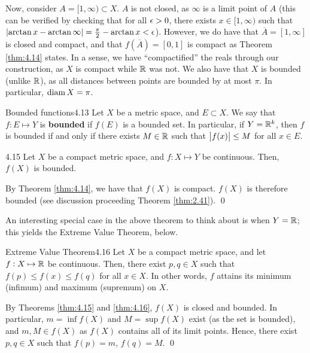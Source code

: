 Now, consider $A = [1, \infty) \subset X$. $A$ is not closed, as $\infty$ is a limit point of $A$ (this can be verified by checking that for all $\epsilon > 0$, there exists $x \in [1, \infty)$ such that $\abs{\arctan x - \arctan \infty} = \frac{\pi}{2} - \arctan x < \epsilon$). However, we do have that $\overline{A} = [1, \infty]$ is closed and compact, and that $f(\overline{A}) = [0, 1]$ is compact as Theorem \ref{thm:4.14} states. In a sense, we have ``compactified'' the reals through our construction, as $X$ is compact while $\mathbb{R}$ was not. We also have that $X$ is bounded (unlike $\mathbb{R}$), as all distances between points are bounded by at most $\pi$. In particular, $\operatorname{diam} X = \pi$. 


\setcounter{rudin}{12}
\begin{definition}{Bounded functions}{4.13}
    Let $X$ be a metric space, and $E \subset X$. We say that $f: E \mapsto Y$ is \textbf{bounded} if $f(E)$ is a bounded set. In particular, if $Y = \mathbb{R}^k$, then $f$ is bounded if and only if there exists $M \in \mathbb{R}$ such that $\abs{f(x)} \leq M$ for all $x \in E$.
\end{definition}

\setcounter{rudin}{14}
\begin{theorem}{}{4.15}
    Let $X$ be a compact metric space, and $f: X \mapsto Y$ be continuous. Then, $f(X)$ is bounded.
\end{theorem}
\begin{nproof}
    By Theorem \ref{thm:4.14}, we have that $f(X)$ is compact. $f(X)$ is therefore bounded (see discussion proceeding Theorem \ref{thm:2.41}). \qed
\end{nproof}
\noindent An interesting special case in the above theorem to think about is when $Y = \mathbb{R}$; this yields the Extreme Value Theorem, below.

\begin{theorem}{Extreme Value Theorem}{4.16}
    Let $X$ be a compact metric space, and let $f: X \mapsto \mathbb{R}$ be continuous. Then, there exist $p, q \in X$ such that $f(p) \leq f(x) \leq f(q)$ for all $x \in X$. In other words, $f$ attains its minimum (infimum) and maximum (supremum) on $X$.
\end{theorem}
\begin{nproof}
    By Theorems \ref{thm:4.15} and \ref{thm:4.16}, $f(X)$ is closed and bounded. In particular, $m = \inf f(X)$ and $M = \sup f(X)$ exist (as the set is bounded), and $m, M \in f(X)$ as $f(X)$ contains all of its limit points. Hence, there exist $p, q \in X$ such that $f(p) = m$, $f(q) = M$. \qed
\end{nproof}

